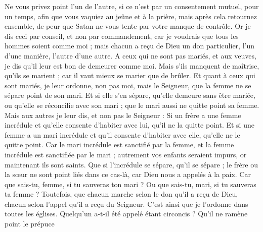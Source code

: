 \begin{multicols}{2}
Ne vous privez point l'un de l'autre, si ce n'est par un consentement mutuel, pour un temps, afin que vous vaquiez au jeûne et à la prière, mais après cela retournez ensemble, de peur que Satan ne vous tente par votre manque de contrôle.
Or je dis ceci par conseil, et non par commandement,
car je voudrais que tous les hommes soient comme moi ; mais chacun a reçu de Dieu un don particulier, l'un d'une manière, l'autre d'une autre.
A ceux qui ne sont pas mariés, et aux veuves, je dis qu'il leur est bon de demeurer comme moi.
Mais s'ils manquent de maîtrise, qu'ils se marient ; car il vaut mieux se marier que de brûler.
Et quant à ceux qui sont mariés, je leur ordonne, non pas moi, mais le Seigneur, que la femme ne se sépare point de son mari.
Et si elle s'en sépare, qu'elle demeure sans être mariée, ou qu'elle se réconcilie avec son mari ; que le mari aussi ne quitte point sa femme.
Mais aux autres je leur dis, et non pas le Seigneur : Si un frère a une femme incrédule et qu'elle consente d'habiter avec lui, qu'il ne la quitte point.
Et si une femme a un mari incrédule et qu'il consente d'habiter avec elle, qu'elle ne le quitte point.
Car le mari incrédule est sanctifié par la femme, et la femme incrédule est sanctifiée par le mari ; autrement vos enfants seraient impurs, or maintenant ils sont saints.
Que si l'incrédule se sépare, qu'il se sépare ; le frère ou la sœur ne sont point liés dans ce cas-là, car Dieu nous a appelés à la paix.
Car que sais-tu, femme, si tu sauveras ton mari ? Ou que sais-tu, mari, si tu sauveras ta femme ?
Toutefois, que chacun marche selon le don qu'il a reçu de Dieu, chacun selon l'appel qu'il a reçu du Seigneur. C'est ainsi que je l'ordonne dans toutes les églises.
Quelqu'un a-t-il été appelé étant circoncis ? Qu'il ne ramène point le prépuce
\end{multicols}
